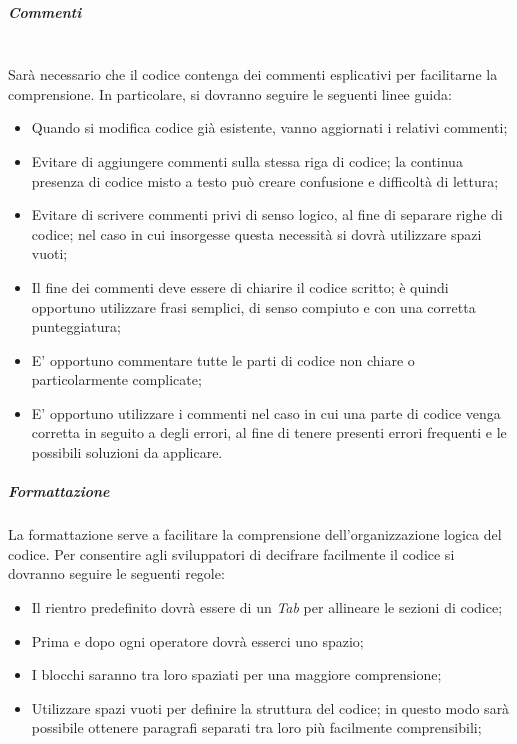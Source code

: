 	\subparagraph{Commenti}
	~\\Sarà necessario che il codice contenga dei commenti esplicativi per facilitarne la comprensione.
	\newline In particolare, si dovranno seguire le seguenti linee guida:
	
	\begin{itemize}
		\item Quando si modifica codice già esistente, vanno aggiornati i relativi commenti;
		\item Evitare di aggiungere commenti sulla stessa riga di codice; la continua presenza di codice misto a testo può creare confusione e difficoltà di lettura;
		\item Evitare di scrivere commenti privi di senso logico, al fine di separare righe di codice; nel caso in cui insorgesse questa necessità si dovrà utilizzare spazi vuoti;
		\item Il fine dei commenti deve essere di chiarire il codice scritto; è quindi opportuno utilizzare frasi semplici, di senso compiuto e con una corretta punteggiatura;
		\item E' opportuno commentare tutte le parti di codice non chiare o particolarmente complicate;
		\item E' opportuno utilizzare i commenti nel caso in cui una parte di codice venga corretta in seguito a degli errori, al fine di tenere presenti errori frequenti e le possibili soluzioni da applicare.
	\end{itemize}
	
	
	\subparagraph{Formattazione}
	La formattazione serve a facilitare la comprensione dell'organizzazione logica del codice. Per consentire agli sviluppatori di decifrare facilmente il codice si dovranno seguire le seguenti regole:
	\begin{itemize} 
		\item Il rientro predefinito dovrà essere di un \emph{Tab} per allineare le sezioni di codice;
		\item Prima e dopo ogni operatore dovrà esserci uno spazio;
		\item I blocchi saranno tra loro spaziati per una maggiore comprensione;
		\item Utilizzare spazi vuoti per definire la struttura del codice; in questo modo sarà possibile ottenere paragrafi separati tra loro più facilmente comprensibili;
	\end{itemize}

